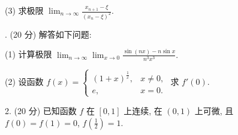 \documentclass{examcollection}
\begin{document}
{\begin{minipage}{\textwidth}
(3) 求极限 $\lim_{n\to \infty}\frac{x_{n + 1} - \xi}{(x_n - \xi)^2}.$\par
{}. (20 分) 解答如下问题:\par
(1) 计算极限 $\lim_{n\to \infty}\lim_{x\to 0}\frac{\sin(nx) - n\sin x}{n^3x^3}.$\par
(2) 设函数 $f(x) = \begin{cases} (1 + x)^{\frac{1}{x}}, & x \neq 0, \\ e, & x = 0. \end{cases}$ 求 $f'(0)$.\par
2. (20 分) 已知函数 $f$ 在 $[0,1]$ 上连续, 在 $(0,1)$ 上可微, 且 $f(0) = f(1) = 0$, $f\left(\frac{1}{2}\right) = 1$.\par
\end{minipage}}
\ifdim\dimexpr\ht\proofbox+\dp\proofbox\relax>\textheight
\noindent\resizebox{!}{\textheight}{\usebox{\proofbox}}\else\noindent\usebox{\proofbox}\fi\clearpage
\end{document}
